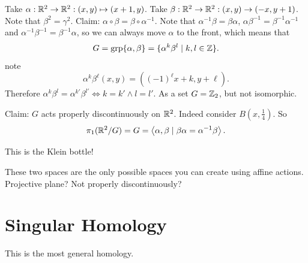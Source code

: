 \begin{eg}
    Take $\alpha: \mathbb{R}^2 \to  \mathbb{R}^2: (x, y) \mapsto (x +1, y)$.
    Take $\beta: \mathbb{R}^2 \to  \mathbb{R}^2: (x, y) \to  (-x, y+1)$.
    Note that $\beta^2 = \gamma^2$.
    Claim: $\alpha  \circ  \beta = \beta  \circ  \alpha ^{-1}$.
    Note that $\alpha^{-1} \beta = \beta \alpha$, $\alpha \beta^{-1} = \beta^{-1} \alpha^{-1}$ and $\alpha^{-1} \beta^{-1} = \beta^{-1} \alpha$, so we can always move $\alpha$ to the front, which means that
    \[
        G = \operatorname{grp} \{\alpha, \beta\}  = \{\alpha ^{k} \beta^{l}  \mid  k, l \in \mathbb{Z}\} .\]
        note
        \[
            \alpha ^{k} \beta^{\ell}(x, y) = ((-1)^{\ell} x + k, y + \ell)
        .\]
        Therefore $\alpha ^{k} \beta^{l} = \alpha ^{k'} \beta^{ l'} \iff k = k' \land l = l'$.
        As a set $G = \mathbb{Z}_2$, but not isomorphic.

        Claim: $G$ acts properly discontinuously on $\mathbb{R}^2$. Indeed consider $B(x, \frac{1}{4})$.
        So \[
            \pi_1 ( \mathbb{R}^2 / G) = G = \left<\alpha, \beta  \mid  \beta \alpha = \alpha^{-1} \beta \right>
        .\]

        \begin{figure}[H]
            \centering
            \label{fig:example-covering-fundamental-group}
        \end{figure}

        This is the Klein bottle!
\end{eg}
\begin{remark}
    These two spaces are the only possible spaces you can create using affine actions.
    Projective plane? Not properly discontinuously?
\end{remark}



\chapter{Singular Homology}

This is the most general homology.

